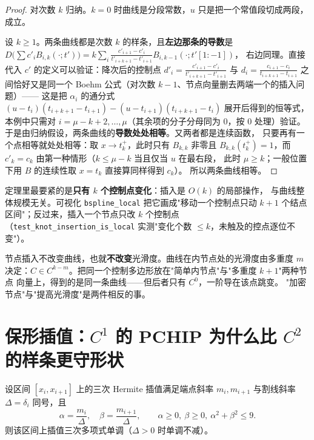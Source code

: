 \begin{proof}
对次数 $k$ 归纳。$k=0$ 时曲线是分段常数，$u$ 只是把一个常值段切成两段，成立。

设 $k\ge1$。两条曲线都是次数 $k$ 的样条，且\textbf{左边那条的导数}是
$D\bigl(\sum c'_iB_{i,k}(\cdot;t')\bigr)
=k\sum_i\frac{c'_{i+1}-c'_i}{t'_{i+k+1}-t'_{i+1}}B_{i,k-1}(\cdot;t'[1{:}{-1}])$，
右边同理。直接代入 $c'$ 的定义可以验证：降次后的控制点
$d'_i=\frac{c'_{i+1}-c'_i}{t'_{i+k+1}-t'_{i+1}}$ 与 $d_i=\frac{c_{i+1}-c_i}{t_{i+k+1}-t_{i+1}}$
之间恰好又是同一个 Boehm 公式（对次数 $k-1$、节点向量删去两端一个的插入问题）——
这是把 $\alpha_i$ 的通分式
$(u-t_i)(t_{i+k+1}-t_{i+1})-(u-t_{i+1})(t_{i+k+1}-t_i)$ 展开后得到的恒等式，
本例中只需对 $i=\mu-k+2,\dots,\mu$（其余项的分子分母同为 $0$，按 $0$ 处理）验证。
于是由归纳假设，两条曲线的\textbf{导数处处相等}。又两者都是连续函数，
只要再有一个点相等就处处相等：取 $x\to t_k^+$，此时只有 $B_{k,k}$ 非零且
$B_{k,k}(t_k^+)=1$，而 $c'_k=c_k$ 由第一种情形（$k\le\mu-k$ 当且仅当 $u$ 在最右段，
此时 $\mu\ge k$；一般位置下用 $B$ 的连续性取 $x=t_k$ 直接算同样得到 $c_k$）。
所以两条曲线相等。
\end{proof}

\begin{remark}
定理里最要紧的是\textbf{只有 $k$ 个控制点变化}：插入是 $O(k)$ 的局部操作，
与曲线整体规模无关。可视化 \texttt{bspline\_local} 把它画成"移动一个控制点只动
$k+1$ 个结点区间"；反过来，插入一个节点只改 $k$ 个控制点
（\texttt{test\_knot\_insertion\_is\_local} 实测"变化个数 $\le k$，未触及的控点逐位不变"）。
\end{remark}

\begin{remark}[多重度决定光滑度]
节点插入不改变曲线，也就\textbf{不改变}光滑度。曲线在内节点处的光滑度由多重度 $m$
决定：$C\in C^{k-m}$。把同一个控制多边形放在"简单内节点"与"多重度 $k+1$"两种节点
向量上，得到的是同一条曲线——但后者只有 $C^0$，一阶导在该点跳变。
"加密节点"与"提高光滑度"是两件相反的事。
\end{remark}

\section{保形插值：$C^1$ 的 PCHIP 为什么比 $C^2$ 的样条更守形状}

\begin{theorem}
\label{thm:fc}
设区间 $[x_i,x_{i+1}]$ 上的三次 Hermite 插值满足端点斜率 $m_i,m_{i+1}$ 与割线斜率
$\Delta=\delta_i$ 同号，且
\[
\alpha=\frac{m_i}{\Delta},\quad\beta=\frac{m_{i+1}}{\Delta},\qquad
\alpha\ge0,\ \beta\ge0,\ \alpha^2+\beta^2\le9 .
\]
则该区间上插值三次多项式单调（$\Delta>0$ 时单调不减）。
\end{theorem}

